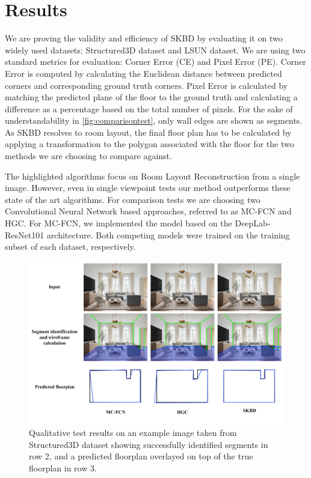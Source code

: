 \section{Results}
\label{sec:results}
We are proving the validity and efficiency of SKBD by evaluating it on two widely used datasets: Structured3D dataset\cite{zheng2020structured3d} and LSUN dataset\cite{zhang2015large}. We are using two standard metrics for evaluation: Corner Error (CE) and Pixel Error (PE). Corner Error is computed by calculating the Euclidean distance between predicted corners and corresponding ground truth corners. Pixel Error is calculated by matching the predicted plane of the floor to the ground truth and calculating a difference as a percentage based on the total number of pixels. For the sake of understandability in \autoref{fig:comparisontest}, only wall edges are shown as segments. As SKBD resolves to room layout, the final floor plan has to be calculated by applying a transformation to the polygon associated with the floor for the two methods we are choosing to compare against.

The highlighted algorithms\cite{8451365}\cite{10350607} focus on Room Layout Reconstruction from a single image. However, even in single viewpoint tests our method outperforms these state of the art algorithms. For comparison tests we are choosing two Convolutional Neural Network based approaches, referred to as MC-FCN\cite{8451365} and HGC\cite{10350607}. For MC-FCN, we implemented the model based on the DeepLab-ResNet101\cite{chen2017deeplab} architecture. Both competing models were trained on the training subset of each dataset, respectively.

\begin{figure}[htbp]
\centering
\includegraphics[width=0.9\linewidth]{images/comparison_test_images.png}
\caption{\label{fig:comparisontest}Qualitative test results on an example image taken from Structured3D dataset\cite{zheng2020structured3d} showing successfully identified segments in row 2, and a predicted floorplan overlayed on top of the true floorplan in row 3.}
\end{figure}

